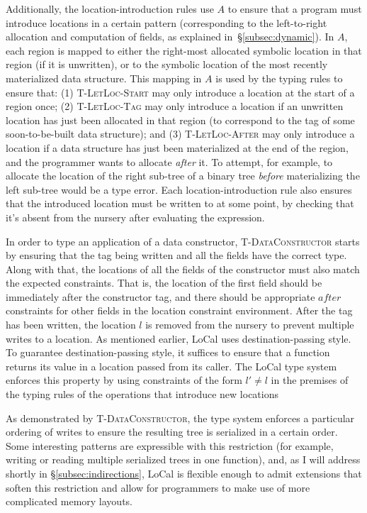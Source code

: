 \documentclass[showabstract,showacknowledgments,showpreface,showdedication,school]{iuphd}
\theoremstyle{nonumberplain}
\newcommand{\sysname}[0]{LoCal\xspace}
\newcommand{\ourcalc}[0]{\sysname}
\newcommand{\keywd}[1]{\mathit{#1}}
\newcommand{\skeywd}[1]{\mathit{#1}}
\newcommand{\loc}{\skeywd{l}}
\newcommand{\AENV}{\keywd{A}}
\newcommand{\tdatacon}{T-DataConstructor}
\newcommand{\tllafter}{T-LetLoc-After}
\newcommand{\tlltag}{T-LetLoc-Tag}
\newcommand{\tllstart}{T-LetLoc-Start}
\newcommand{\secref}[1]{\S\ref{#1}}
\begin{document}
Additionally, the location-introduction rules use $\AENV$ to ensure that a program
must introduce locations in a certain pattern (corresponding to the
left-to-right allocation and computation of fields, as explained
in~\secref{subsec:dynamic}).
In $\AENV$, each region is mapped to either the right-most allocated
symbolic location in that region (if it is unwritten), or to the
symbolic location of the most recently materialized data structure.
This mapping in $\AENV$ is used by the typing rules to ensure that:
(1) \textsc{\tllstart} may only introduce a location at the start
of a region once;
(2) \textsc{\tlltag} may only introduce a location if an unwritten location has
just been allocated in that region (to correspond to the tag of some
soon-to-be-built data structure); and
(3) \textsc{\tllafter} may only introduce a location if a data structure has
just been materialized at the end of the region, and the programmer wants to
allocate \emph{after} it. To attempt, for example, to allocate the location of
the right sub-tree of a binary tree \emph{before} materializing the left sub-tree would
be a type error.
{Each location-introduction rule also ensures that the
introduced location must be written to at some point, by checking that
it's absent from the nursery after evaluating the expression.}



In order to type an application of a data constructor, \textsc{\tdatacon} starts by
ensuring that the tag being written and all the fields have the correct type.
Along with that, the locations of all the fields of the constructor must
also match the expected constraints. That is, the location of the first field
should be immediately after the constructor tag, and there should be
appropriate $\mathit{after}$ constraints for other fields in the location constraint environment.
After the tag has been written, the location $\loc$ is removed from the
nursery to prevent multiple writes to a location.
{
As mentioned earlier, LoCal uses destination-passing style. To guarantee destination-passing
style, it suffices to ensure that a function returns its value in a location passed from its caller.
The LoCal type system enforces this property by using constraints of the form $l' \neq l$ in the premises
of the typing rules of the operations that introduce new locations
}

{As demonstrated by \textsc{\tdatacon}, the type system enforces a
  particular ordering of writes to ensure the resulting tree is
  serialized in a certain order. Some interesting patterns are
  expressible with this restriction (for example, writing or reading
  multiple serialized trees in one function), and, as I will address
  shortly in \secref{subsec:indirections}, \ourcalc is flexible enough
  to admit extensions that soften this restriction and allow for
  programmers to make use of more complicated memory layouts.}
\end{document}
